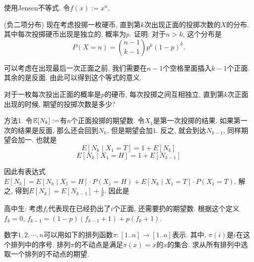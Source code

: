 \begin{solution*}
    使用Jensen不等式. 令$f(x):=x^n$. 
\end{solution*}

\begin{exercise}
    (负二项分布) 现在考虑投掷一枚硬币, 直到第$k$次出现正面的投掷次数的$X$的分布. 其中每次投掷硬币出现是独立的, 概率为$p$. 证明: 对于$n>k$, 这个分布是
    $$
    P(X=n) = \binom{n-1}{k-1}p^k(1-p)^k.
    $$
\end{exercise}

\begin{solution*}
    可以考虑在出现最后一次正面之前, 我们需要在$n-1$个空格里面插入$k-1$个正面. 其余的是反面. 由此可以得到这个等式的意义. 
\end{solution*}

\begin{exercise}
    对于一枚每次投出正面的概率是$p$的硬币, 每次投掷之间互相独立, 直到第$k$次正面出现的时候, 期望的投掷次数是多少? 
\end{exercise}

\begin{solution*}

    方法1. 令$\mathbb E[N_k]:=$有$n$个正面投掷的期望数. 令$X_1$是第一次投掷的结果. 如果第一次的结果是反面, 那么还会回到$N_k$, 但是期望会加1. 反之, 就会到达$N_{k-1}$, 同样期望会加一. 也就是
    $$
E\left[N_k \mid X_1=T\right]=1+E\left[N_k\right]
$$
$$
E\left[N_k \mid X_1=H\right]=1+E\left[N_{k-1}\right]
$$

因此有表达式$E\left[N_k\right]=E\left[N_k \mid X_1=H\right] \cdot P\left(X_1=H\right)+E\left[N_k \mid X_1=T\right] \cdot P\left(X_1=T\right)$. 解之, 得到$E\left[N_k\right]=E\left[N_{k-1}\right]+\frac{1}{p}$. 因此是

    高中生: 考虑$f_i$代表现在已经扔出了$i$个正面, 还需要扔的期望数. 根据这个定义$f_k=0$, $f_{k-1}=(1-p)(f_{k-1}+1)+p(f_k+1)$. 

\end{solution*}

\begin{exercise}
     数字$1,2,\cdots, n$可以用如下的排列函数$\pi:[1..n] \to [1..n]$表示. 其中, $\pi(i)$是$i$在这个排列中的序号. 排列$\pi$的不动点是满足$\pi(x)=x$的$x$的集合. 求从所有排列中选取一个排列的不动点的期望. 
\end{exercise}

\begin{solution*}
    
\end{solution*}